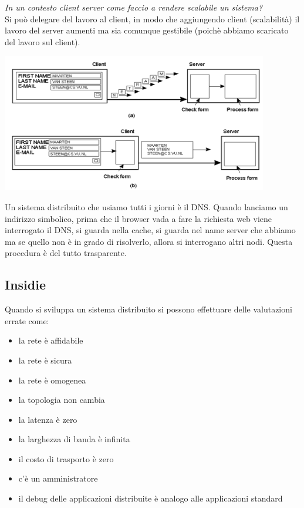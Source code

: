 \textit{In un contesto client server come faccio a rendere scalabile un sistema?} \\Si può delegare del lavoro al client, in modo che aggiungendo client (scalabilità) il lavoro del server aumenti ma sia comunque gestibile (poichè abbiamo scaricato del lavoro sul client).\\
\begin{center}
    \includegraphics[width = .8\textwidth]{images/lezione1/Scaling.png}
\end{center}
Un sistema distribuito che usiamo tutti i giorni è il DNS. 
Quando lanciamo un indirizzo simbolico, prima che il browser vada a fare la richiesta web viene interrogato il DNS, si guarda nella cache,  si guarda nel name server che abbiamo ma se quello non è in grado di risolverlo, allora si interrogano altri nodi.
Questa procedura è del tutto trasparente. 


\subsection{Insidie}
Quando si sviluppa un sistema distribuito si possono effettuare delle valutazioni errate come:
\begin{itemize}
    \item la rete è affidabile
    \item la rete è sicura 
    \item la rete è omogenea
    \item la topologia non cambia
    \item la latenza è zero
    \item la larghezza di banda è infinita
    \item il costo di trasporto è zero
    \item c'è un amministratore
    \item il debug delle applicazioni distribuite è analogo alle applicazioni standard
\end{itemize} 

